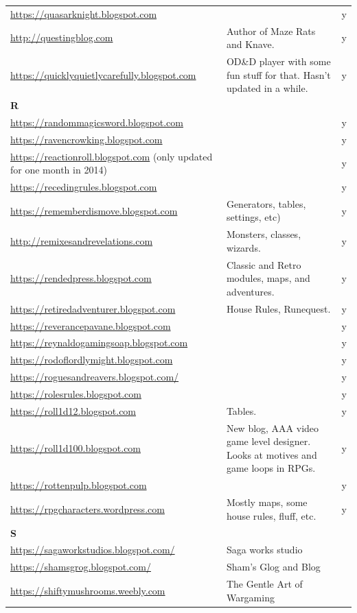 \documentclass[a4paper, 11pt, twoside]{article}
\begin{document}
\begin{longtable}{p{6cm}p{8cm}c}
\url{https://quasarknight.blogspot.com} &  & y\\
\url{http://questingblog.com} & Author of Maze Rats and Knave. & y\\
\url{https://quicklyquietlycarefully.blogspot.com} & OD\&D player with some fun stuff for that. Hasn't updated in a while. & y\\
\textbf{R} &  & \\
\url{https://randommagicsword.blogspot.com} &  & y\\
\url{https://ravencrowking.blogspot.com} &  & y\\
\url{https://reactionroll.blogspot.com} (only updated for one month in 2014) &  & y\\
\url{https://recedingrules.blogspot.com} &  & y\\
\url{https://rememberdismove.blogspot.com} & Generators, tables, settings, etc) & y\\
\url{http://remixesandrevelations.com} & Monsters, classes, wizards. & y\\
\url{https://rendedpress.blogspot.com} & Classic and Retro modules, maps, and adventures. & y\\
\url{https://retiredadventurer.blogspot.com} & House Rules, Runequest. & y\\
\url{https://reverancepavane.blogspot.com} &  & y\\
\url{https://reynaldogamingsoap.blogspot.com} &  & y\\
\url{https://rodoflordlymight.blogspot.com} &  & y\\
\url{https://roguesandreavers.blogspot.com/} &  & y\\
\url{https://rolesrules.blogspot.com} &  & y\\
\url{https://roll1d12.blogspot.com} & Tables. & y\\
\url{https://roll1d100.blogspot.com} & New blog, AAA video game level designer. Looks at motives and game loops in RPGs. & y\\
\url{https://rottenpulp.blogspot.com} &  & y\\
\url{https://rpgcharacters.wordpress.com} & Mostly maps, some house rules, fluff, etc. & y\\
\textbf{S} &  & \\
\url{https://sagaworkstudios.blogspot.com/} & Saga works studio & \\
\url{https://shamsgrog.blogspot.com/} & Sham's Glog and Blog & \\
\url{https://shiftymushrooms.weebly.com} & The Gentle Art of Wargaming & \\

\end{longtable}
\end{document}
